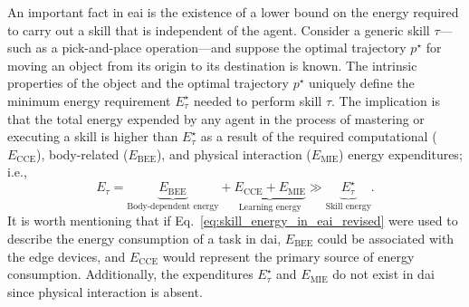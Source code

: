 \documentclass[12pt]{article}
\begin{document}
An important fact in \ac{eai} is the existence of a lower bound on the energy required to carry out a skill that is independent of the agent. Consider a generic skill $\tau$---such as a pick-and-place operation---and suppose the optimal trajectory $p^\star$ for moving an object from its origin to its destination is known. The intrinsic properties of the object and the optimal trajectory $p^\star$ uniquely define the minimum energy requirement $E^\star_{\tau}$ needed to perform skill $\tau$. The implication is that the total energy expended by any agent in the process of mastering or executing a skill is higher than $E^\star_{\tau}$ as a result of the required computational ($E_\text{CCE}$), body-related ($E_\text{BEE}$), and physical interaction ($E_\text{MIE}$) energy expenditures; i.e.,
\begin{equation}\label{eq:skill_energy_in_eai_revised}
	E_{\tau} =  \underbrace{E_\text{BEE}}_{\text{Body-dependent energy}} + \underbrace{E_\text{CCE} + E_\text{MIE}}_{\text{Learning energy}} \gg \underbrace{E^\star_{\tau}}_{\text{Skill energy}}.
\end{equation}
It is worth mentioning that if Eq.~\eqref{eq:skill_energy_in_eai_revised} were used to describe the energy consumption of a task in \ac{dai}, $E_\text{BEE}$ could be associated with the edge devices, and $E_\text{CCE}$ would represent the primary source of energy consumption. Additionally, the expenditures $E^\star_{\tau}$ and $E_\text{MIE}$ do not exist in \ac{dai} since physical interaction is absent.
\end{document}
